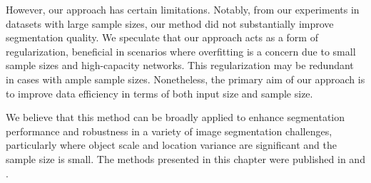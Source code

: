 However, our approach has certain limitations. Notably, from our experiments in datasets with large sample sizes, our method did not substantially improve segmentation quality. We speculate that our approach acts as a form of regularization, beneficial in scenarios where overfitting is a concern due to small sample sizes and high-capacity networks. This regularization may be redundant in cases with ample sample sizes. Nonetheless, the primary aim of our approach is to improve data efficiency in terms of both input size and sample size.

We believe that this method can be broadly applied to enhance segmentation performance and robustness in a variety of image segmentation challenges, particularly where object scale and location variance are significant and the sample size is small. The methods presented in this chapter were published in \cite{bencevicSegmentthenSegmentContextPreservingCropBased2023a} and \cite{bencevicCropGuidedNeuralNetwork2024}.


 